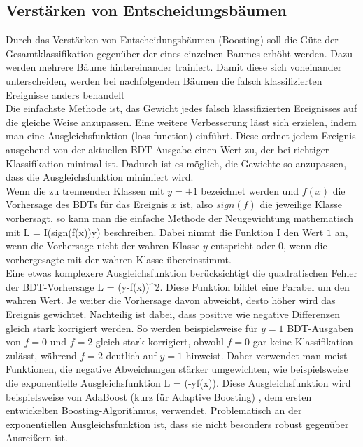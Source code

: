 \subsection{Verst\"arken von Entscheidungsb\"aumen}
\label{ch:Algorithmen:subsec:Boosting}

Durch das Verst\"arken von Entscheidungsb\"aumen (Boosting) soll die G\"ute der Gesamtklassifikation gegen\"uber der eines einzelnen Baumes erh\"oht werden. Dazu werden mehrere B\"aume hintereinander trainiert. Damit diese sich voneinander unterscheiden, werden bei nachfolgenden B\"aumen die falsch klassifizierten Ereignisse anders behandelt\\
Die einfachste Methode ist, das Gewicht jedes falsch klassifizierten Ereignisses auf die gleiche Weise anzupassen. Eine weitere Verbesserung l\"asst sich erzielen, indem man eine Ausgleichsfunktion (loss function) einf\"uhrt. Diese ordnet jedem Ereignis ausgehend von der aktuellen BDT-Ausgabe einen Wert zu, der bei richtiger Klassifikation minimal ist. Dadurch ist es m\"oglich, die Gewichte so anzupassen, dass die Ausgleichsfunktion minimiert wird.\\
Wenn die zu trennenden Klassen mit $y=\pm1$ bezeichnet werden und $f(x)$ die Vorhersage des BDTs für das Ereignis $x$ ist, also $sign(f)$ die jeweilige Klasse vorhersagt, so kann man die einfache Methode der Neugewichtung mathematisch mit
\beq
L = I(sign(f(x))\neq y)
\label{eq:missclass_loss}
\eeq
beschreiben. Dabei nimmt die Funktion I den Wert $1$ an, wenn die Vorhersage nicht der wahren Klasse $y$ entspricht oder $0$, wenn die vorhergesagte mit der wahren Klasse \"ubereinstimmt.\\
Eine etwas komplexere Ausgleichsfunktion ber\"ucksichtigt die quadratischen Fehler der BDT-Vorhersage
\beq
L = (y-f(x))^2.
\label{eq:squarederror_loss}
\eeq
Diese Funktion bildet eine Parabel um den wahren Wert. Je weiter die Vorhersage davon abweicht, desto h\"oher wird das Ereignis gewichtet. Nachteilig ist dabei, dass positive wie negative Differenzen gleich stark korrigiert werden. So werden beispielsweise f\"ur $y=1$ BDT-Ausgaben von $f=0$ und $f=2$ gleich stark korrigiert, obwohl $f=0$ gar keine Klassifikation zul\"asst, w\"ahrend $f=2$ deutlich auf $y=1$ hinweist. Daher verwendet man meist Funktionen, die negative Abweichungen st\"arker umgewichten, wie beispielsweise die exponentielle Ausgleichsfunktion
\beq
L = \exp(-y\cdot f(x)).
\label{eq:exp_loss}
\eeq
Diese Ausgleichsfunktion wird beispielsweise von AdaBoost (kurz f\"ur Adaptive Boosting) \cite{ADABoost}, dem ersten entwickelten Boosting-Algorithmus, verwendet. Problematisch an der exponentiellen Ausgleichsfunktion ist, dass sie nicht besonders robust gegen\"uber Ausrei\ss ern ist.\\
